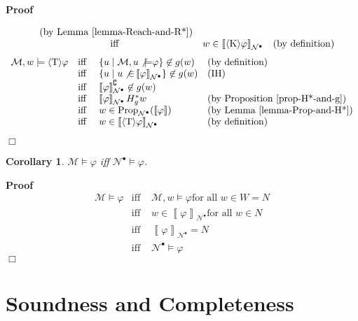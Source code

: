 \documentclass{article}
\newcommand{\nin}{\not\in}
\newcommand{\tmmathbf}[1]{\ensuremath{\boldsymbol{#1}}}
\newcommand{\tmop}[1]{\ensuremath{\operatorname{#1}}}
\newcommand{\tmtextbf}[1]{\text{{\bfseries{#1}}}}
\newenvironment{proof}{\noindent\textbf{Proof\ }}{\hspace*{\fill}$\Box$\medskip}
\newtheorem{corollary}{Corollary}
\newcommand{\Model}{\mathcal{M}}
\newcommand{\Net}{\ensuremath{\mathcal{N}}}
\newcommand{\semantics}[1]{\left\llbracket #1 \right\rrbracket}
\newcommand{\diaKnow}{\langle \tmmathbf{\text{K}} \rangle}
\newcommand{\diaTyp}{\langle \tmmathbf{\text{T}} \rangle}
\newcommand{\Prop}{\textsf{\tmop{Prop}}}
\begin{document}
\begin{proof}
\begin{description}
\[\begin{array}{lcll}
         & \text{(by Lemma~\ref{lemma-Reach-and-R*})}\\
         & \text{iff } & w \in \semantics{\diaKnow \varphi}_{\Net^{\bullet}}
         & \text{(by definition)}
       \end{array} \]
    \tmtextbf{$\diaTyp \varphi$ case:}
    \[ \begin{array}{lcll}
         \Model, w \models \diaTyp \varphi & \text{iff } & \left\{ u \mid
         \Model, u \not{\models} \varphi \right\} \nin g (w) & \text{(by
         definition)}\\
         & \text{iff } & \left\{ u \mid u \not{\in}
         \semantics{\varphi}_{\Net^{\bullet}} \right\} \nin g (w) &
         \text{(IH)}\\
         & \text{iff } & \semantics{\varphi}_{\Net^{\bullet}}^{\complement}
         \nin g (w) & \\
         & \text{iff } & \semantics{\varphi}_{\Net^{\bullet}} H_g^{\ast} w &
         \text{(by Proposition~\ref{prop-H*-and-g})}\\
         & \text{iff } & w \in \Prop_{\Net^{\bullet}} (\semantics{\varphi}) &
         \text{(by Lemma~\ref{lemma-Prop-and-H*})}\\
         & \text{iff } & w \in \semantics{\diaTyp \varphi}_{\Net^{\bullet}} &
         \text{(by definition)}
       \end{array} \]
  \end{description}
\end{proof}

\begin{corollary}
  $\mathcal{M} \models \varphi$ iff $\Net^{\bullet} \models \varphi$.
\end{corollary}

\begin{proof}
  \[ \begin{array}{lcl}
       \Model \models \varphi & \text{iff } & \Model, w \models \varphi
       \text{for all } w \in W = N\\
       & \text{iff } & w \in \semantics{\varphi}_{\Net^{\bullet}} \text{for
       all } w \in N\\
       & \text{iff } & \semantics{\varphi}_{\Net^{\bullet}} = N\\
       & \text{iff } & \Net^{\bullet} \models \varphi
     \end{array} \]
\end{proof}

\section{Soundness and Completeness}
\end{document}

